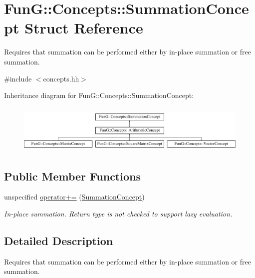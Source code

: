 \hypertarget{structFunG_1_1Concepts_1_1SummationConcept}{\section{Fun\-G\-:\-:Concepts\-:\-:Summation\-Concept Struct Reference}
\label{structFunG_1_1Concepts_1_1SummationConcept}
}


Requires that summation can be performed either by in-\/place summation or free summation.  




{\ttfamily \#include $<$concepts.\-hh$>$}

Inheritance diagram for Fun\-G\-:\-:Concepts\-:\-:Summation\-Concept\-:\begin{figure}[H]
\begin{center}
\leavevmode
\includegraphics[height=2.352941cm]{structFunG_1_1Concepts_1_1SummationConcept}
\end{center}
\end{figure}
\subsection*{Public Member Functions}
\begin{DoxyCompactItemize}
\item 
unspecified \hyperlink{structFunG_1_1Concepts_1_1SummationConcept_aa8214ca88fddf74e3bc9e7dbfe2b606f}{operator+=} (\hyperlink{structFunG_1_1Concepts_1_1SummationConcept}{Summation\-Concept})
\begin{DoxyCompactList}\small\item\em In-\/place summation. Return type is not checked to support lazy evaluation. \end{DoxyCompactList}\end{DoxyCompactItemize}


\subsection{Detailed Description}
Requires that summation can be performed either by in-\/place summation or free summation. 

